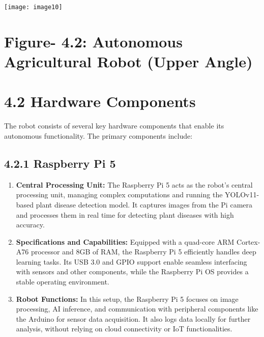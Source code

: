 \documentclass{book} %
\begin{document}
\noindent 

\noindent 

\noindent 

\noindent \texttt{[image: image10]}

\noindent 

\noindent 

\noindent 

\noindent 

\noindent 
\section{}

\noindent 
\section{}


\section{Figure- 4.2: Autonomous Agricultural Robot (Upper Angle)}

\noindent 
\section{4.2 Hardware Components}

\noindent The robot consists of several key hardware components that enable its autonomous functionality. The primary components include:

\noindent 
\subsection{4.2.1 Raspberry Pi 5}

\begin{enumerate}
\item \textbf{ Central Processing Unit: }The Raspberry Pi 5 acts as the robot's central processing unit, managing complex computations and running the YOLOv11-based plant disease detection model. It captures images from the Pi camera and processes them in real time for detecting plant diseases with high accuracy.

\item  \textbf{Specifications and Capabilities: }Equipped with a quad-core ARM Cortex-A76 processor and 8GB of RAM, the Raspberry Pi 5 efficiently handles deep learning tasks. Its USB 3.0 and GPIO support enable seamless interfacing with sensors and other components, while the Raspberry Pi OS provides a stable operating environment.

\item  \textbf{Robot Functions: }In this setup, the Raspberry Pi 5 focuses on image processing, AI inference, and communication with peripheral components like the Arduino for sensor data acquisition. It also logs data locally for further analysis, without relying on cloud connectivity or IoT functionalities.
\end{enumerate}
\end{document}
